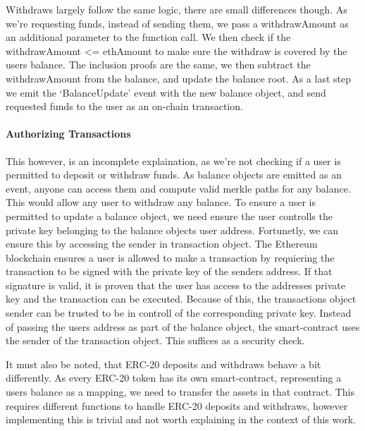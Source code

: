 \documentclass[../../thesis.tex]{subfiles}
\begin{document}
Withdraws largely follow the same logic, there are small differences though. As we're requesting funds, instead of sending them, we pass a withdrawAmount as an additional parameter to the function call. We then check if the withdrawAmount <= ethAmount to make sure the withdraw is covered by the users balance. The inclusion proofs are the same, we then subtract the withdrawAmount from the balance, and update the balance root. As a last step we emit the `BalanceUpdate' event with the new balance object, and send requested funds to the user as an on-chain transaction.

\paragraph{Authorizing Transactions}
This however, is an incomplete explaination, as we're not checking if a user is permitted to deposit or withdraw funds. As balance objects are emitted as an event, anyone can access them and compute valid merkle paths for any balance. This would allow any user to withdraw any balance. To ensure a user is permitted to update a balance object, we need ensure the user controlls the private key belonging to the balance objects user address. Fortunetly, we can ensure this by accessing the sender in transaction object. The Ethereum blockchain ensures a user is allowed to make a transaction by requiering the transaction to be signed with the private key of the senders address. If that signature is valid, it is proven that the user has access to the addresses private key and the transaction can be executed. Because of this, the transactions object sender can be trusted to be in controll of the corresponding private key. Instead of passing the users address as part of the balance object, the smart-contract uses the sender of the transaction object. This suffices as a security check.

It must also be noted, that ERC-20 deposits and withdraws behave a bit differently. As every ERC-20 token has its own smart-contract, representing a users balance as a mapping, we need to transfer the assets in that contract. This requires different functions to handle ERC-20 deposits and withdraws, however implementing this is trivial and not worth explaining in the context of this work. 
\end{document}
